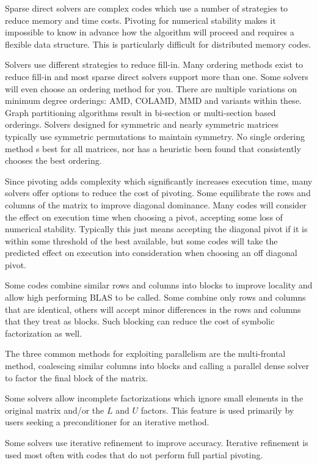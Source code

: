 \documentclass[acmtocl]{acmtrans2m}
\begin{document}
\bigskip

Sparse direct solvers are complex codes which use a number of
strategies to reduce memory and time costs.  Pivoting for numerical
stability makes it impossible to know in advance how the algorithm
will proceed and requires a flexible data structure.  This is
particularly difficult for distributed memory codes.  

Solvers use different strategies to reduce fill-in.  Many ordering
methods exist to reduce fill-in and most sparse direct solvers support
more than one.  Some solvers will even choose an ordering method for
you.  There are multiple variations on minimum degree orderings: AMD,
COLAMD, MMD and variants within these.  Graph partitioning algorithms
result in bi-section or multi-section based orderings.  Solvers
designed for symmetric and nearly symmetric matrices typically use
symmetric permutations to maintain symmetry.  No single ordering
method s best for all matrices, nor has a heuristic been found that
consistently chooses the best ordering.

Since pivoting adds complexity which significantly increases execution
time, many solvers offer options to reduce the cost of pivoting.  Some
equilibrate the rows and columns of the matrix to improve diagonal
dominance.  Many codes will consider the effect on execution time when
choosing a pivot, accepting some loss of numerical stability.
Typically this just means accepting the diagonal pivot if it is within
some threshold of the best available, but some codes will take the
predicted effect on execution into consideration when choosing an off
diagonal pivot.

Some codes combine similar rows and columns into blocks to improve
locality and allow high performing BLAS to be called.  Some combine
only rows and columns that are identical, others will accept minor
differences in the rows and columns that they treat as blocks.  Such
blocking can reduce the cost of symbolic factorization as well.

The three common methods for exploiting parallelism are the
multi-frontal method, coalescing  similar 
columns into blocks and calling a parallel dense solver 
to factor the final block of the matrix.

Some solvers allow incomplete factorizations which ignore small
elements in the original matrix and/or the $L$ and $U$ factors.
This feature is used primarily by users seeking a
preconditioner for an iterative method.

Some solvers use iterative refinement to improve accuracy.  Iterative
refinement is used most often with codes that do not perform full partial pivoting.  
\end{document}
